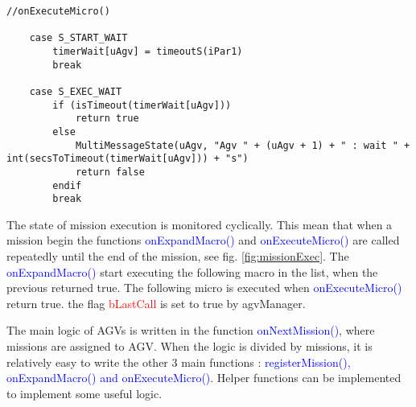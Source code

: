 \begin{lstlisting}[caption=onExecuteMicro() micro are aexecuted]
	//onExecuteMicro()
	
	case S_START_WAIT
		timerWait[uAgv] = timeoutS(iPar1)
		break
	
	case S_EXEC_WAIT
		if (isTimeout(timerWait[uAgv]))
			return true
		else
			MultiMessageState(uAgv, "Agv " + (uAgv + 1) + " : wait " + int(secsToTimeout(timerWait[uAgv])) + "s")
			return false
		endif
		break
\end{lstlisting}

The state of mission execution is monitored cyclically. This mean that when a mission begin the functions \textcolor{blue}{onExpandMacro()} and \textcolor{blue}{onExecuteMicro()} are called repeatedly until the end of the mission, see fig. \ref{fig:missionExec}.
The \textcolor{blue}{onExpandMacro()} start executing the following macro in the list, when the previous returned true. The following micro is executed when \textcolor{blue}{onExecuteMicro()} return true. the flag \textcolor{red}{bLastCall} is set to true by agvManager.

The main logic of AGVs is written in the function \textcolor{blue}{onNextMission()}, where missions are assigned to AGV. When the logic is divided by missions, it is relatively easy to write the other 3 main functions : \textcolor{blue}{ registerMission(), onExpandMacro() and onExecuteMicro()}. Helper functions can be implemented to implement some useful logic.
